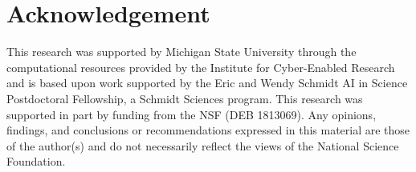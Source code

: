 \section*{Acknowledgement}

{\footnotesize
This research was supported by Michigan State University through the computational resources provided by the Institute for Cyber-Enabled Research and is based upon work supported by the Eric and Wendy Schmidt AI in Science Postdoctoral Fellowship, a Schmidt Sciences program.
This research was supported in part by funding from the NSF (DEB 1813069).
Any opinions, findings, and conclusions or recommendations expressed in this material are those of the author(s) and do not necessarily reflect the views of the National Science Foundation.
}
